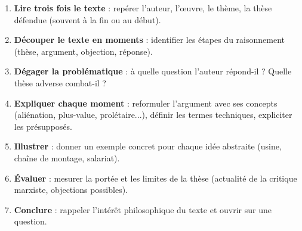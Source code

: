 \documentclass[11pt]{article}
\newcommand{\cle}[1]{{\popxbold\color{popdark}#1}}
\begin{document}
\begin{methode}
\begin{enumerate}
\item \textbf{Lire trois fois le texte} : repérer l'auteur, l'œuvre, le thème, la thèse défendue (souvent à la fin ou au début).
\item \textbf{Découper le texte en moments} : identifier les étapes du raisonnement (thèse, argument, objection, réponse).
\item \textbf{Dégager la problématique} : à quelle question l'auteur répond-il ? Quelle thèse adverse combat-il ?
\item \textbf{Expliquer chaque moment} : reformuler l'argument avec ses concepts (\cle{aliénation}, \cle{plus-value}, \cle{prolétaire}...), définir les termes techniques, expliciter les présupposés.
\item \textbf{Illustrer} : donner un exemple concret pour chaque idée abstraite (usine, chaîne de montage, salariat).
\item \textbf{Évaluer} : mesurer la portée et les limites de la thèse (actualité de la critique marxiste, objections possibles).
\item \textbf{Conclure} : rappeler l'intérêt philosophique du texte et ouvrir sur une question.
\end{enumerate}
\end{methode}
\end{document}
